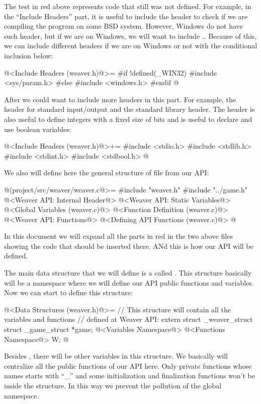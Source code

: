 The test in red above represents code that still was not defined. For
example, in the ``Include Headers'' part, it is useful to include the
header  to check if we are compiling the
program on some BSD system. However, Windows do not have such header,
but if we are on Windows, we will want to
include .. Because of this, we can include
different headers if we are  on Windows or not with the conditional
inclusion below:

\iniciocodigo
@<Include Headers (weaver.h)@>=
#if !defined(_WIN32)
#include <sys/param.h>
#else
#include <windows.h>
#endif
@
\fimcodigo

After we could want to include more headers in this part. For example,
the header for standard input/output and the standard library
header. The header  is also useful to define
integers with a fixed size of bits and  is
useful to declare and use boolean variables:

\iniciocodigo
@<Include Headers (weaver.h)@>+=
#include <stdio.h>
#include <stdlib.h>
#include <stdint.h>
#include <stdbool.h>
@
\fimcodigo

We also will define here the general structure of
file  from our API:

\iniciocodigo
@(project/src/weaver/weaver.c@>=
#include "weaver.h"
#include "../game.h"
@<Weaver API: Internal Header@>
@<Weaver API: Static Variables@>
@<Global Variables (weaver.c)@>
@<Function Definition (weaver.c)@>
@<Weaver API: Functions@>
@<Defining API Functions (weaver.c)@>
@
\fimcodigo

In this document we will expand all the parts in red in the two above
files showing the code that should be inserted there. ANd this is how
our API will be defined.


The main data structure that we will define is a
 called . This structure
basically will be a namespace where we will define our API public
functions and variables. Now we can start to define this structure:

\iniciocodigo
@<Data Structures (weaver.h)@>=
// This structure will contain all the variables and functions
// defined at Weaver API:
extern struct _weaver_struct{
  struct _game_struct *game;
  @<Variables Namespace@>
  @<Functions Namespace@>
} W;
@
\fimcodigo

Besides , there will be other variables in this
structure. We basically will centralize all the public functions of
our API here. Only private functions whose names starts with ``\_''
and some initialization and finalization functions won't be inside
the  structure. In this way we prevent the pollution of
the global namespace.

